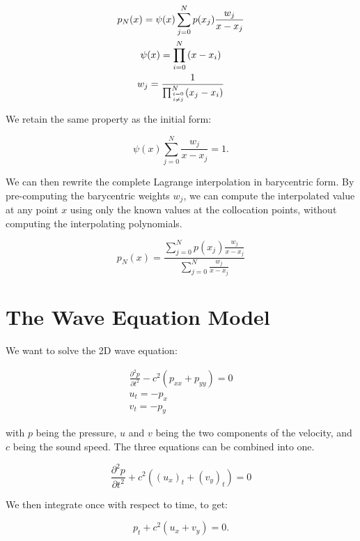 \begin{gather}
	p_N(x) = \psi(x)\sum_{j = 0}^{N}p(x_j)\frac{w_j}{x - x_j} \\
	\psi(x) = \prod_{i = 0}^{N}\left ( x - x_i \right ) \\
	w_j = \frac{1}{\prod_{\genfrac{}{}{0pt}{2}{i = 0}{i \neq j}}^{N}(x_j - x_i)}
\end{gather}

\noindent
We retain the same property as the initial form:

\begin{equation}
	\psi(x)\sum_{j = 0}^{N}\frac{w_j}{x - x_j} = 1.
\end{equation}

We can then rewrite the complete Lagrange interpolation in barycentric form. By pre-computing the
barycentric weights \(w_j\), we can compute the interpolated value at any point \(x\) using only the
known values at the collocation points, without computing the interpolating polynomials. 

\begin{equation}
	p_N(x) = \frac{\sum_{j = 0}^{N} p(x_j)\frac{w_j}{x - x_j}}{\sum_{j = 0}^{N}\frac{w_j}{x - x_j}}
\end{equation}

\section{The Wave Equation Model}\label{section:spectral_element_method:equation}

We want to solve the 2D wave equation:

\begin{gather}
	\frac{\partial^2p}{\partial t^2} - c^2(p_{xx} + p_{yy}) = 0 \\
	u_t = - p_x \\
	v_t = -p_y
\end{gather}

\noindent
with \(p\) being the pressure, \(u\) and \(v\) being the two components of the velocity, and \(c\)
being the sound speed. The three equations can be combined into one.

\begin{equation} \label{equ:2d_wave}
	\frac{\partial^2p}{\partial t^2} + c^2 \left( {\left( u_x \right)}_t + {\left( v_y \right)}_t \right) = 0
\end{equation}

We then integrate once with respect to time, to get:

\begin{equation} \label{equ:2d_wave_integrated}
	p_t + c^2\left ( u_x + v_y \right ) = 0.
\end{equation}

